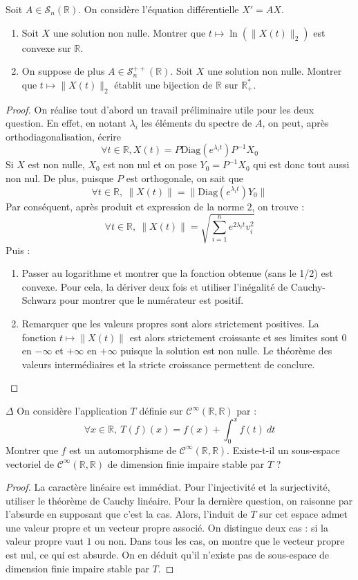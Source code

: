 \documentclass[french,a4paper]{article}
\newcommand{\R}{\mathbb{R}}
\newcommand{\st}{^*}
\newcommand{\inv}{^{-1}}
\theoremstyle{plain}
\theoremstyle{definition}
\theoremstyle{remark}
\begin{document}
\begin{ex}{}
	Soit $A\in\mathcal{S}_n(\R)$. On considère l'équation différentielle $X'=AX$.
	\begin{enumerate}
		\item Soit $X$ une solution non nulle. Montrer que $t\mapsto\ln\left(\lVert X(t)\rVert_2\right)$ est convexe sur $\R$.
		\item On suppose de plus $A\in\mathcal{S}_n^{++}(\R)$. Soit $X$ une solution non nulle. Montrer que $t\mapsto \lVert X(t)\rVert_2$ établit une bijection de $\R$ sur $\R_+\st$.
	\end{enumerate}
\end{ex}
\begin{proof}
	On réalise tout d'abord un travail préliminaire utile pour les deux question. En effet, en notant $\lambda_i$ les éléments du spectre de $A$, on peut, après orthodiagonalisation, écrire $$\forall t\in\R, X(t)=P\text{Diag}(e^{\lambda_i t})P\inv X_0$$ Si $X$ est non nulle, $X_0$ est non nul et on pose $Y_0=P\inv X_0$ qui est donc tout aussi non nul. De plus, puisque $P$ est orthogonale, on sait que $$\forall t\in\R,\ \lVert X(t)\rVert =\lVert \text{Diag}(e^{\lambda_i t})Y_0\rVert$$ Par conséquent, après produit et expression de la norme $2$, on trouve : $$\forall t\in\R,\ \lVert X(t)\rVert=\sqrt{\sum_{i=1}^{n}e^{2\lambda_i t}v_i^2}$$
	Puis :
	\begin{enumerate}
		\item Passer au logarithme et montrer que la fonction obtenue (sans le 1/2) est convexe. Pour cela, la dériver deux fois et utiliser l'inégalité de Cauchy-Schwarz pour montrer que le numérateur est positif.
		\item Remarquer que les valeurs propres sont alors strictement positives. La fonction $t\mapsto\lVert X(t)\rVert$ est alors strictement croissante et ses limites sont $0$ en $-\infty$ et $+\infty$ en $+\infty$ puisque la solution est non nulle. Le théorème des valeurs intermédiaires et la stricte croissance permettent de conclure.
	\end{enumerate}
\end{proof}

\begin{ex}[Moulin.38]{$\Delta$}
	On considère l'application $T$ définie sur $\mathcal{C}^{\infty}(\R,\R)$ par : $$\forall x\in\R,\ T(f)(x)=f(x)+\int_{0}^{x}f(t)\ dt$$ Montrer que $f$ est un automorphisme de $\mathcal{C}^\infty(\R,\R)$. Existe-t-il un sous-espace vectoriel de $\mathcal{C}^\infty(\R,\R)$ de dimension finie impaire stable par $T$ ?
\end{ex}
\begin{proof}
	La caractère linéaire est immédiat. Pour l'injectivité et la surjectivité, utiliser le théorème de Cauchy linéaire. Pour la dernière question, on raisonne par l'absurde en supposant que c'est la cas. Alors, l'induit de $T$ sur cet espace admet une valeur propre et un vecteur propre associé. On distingue deux cas : si la valeur propre vaut $1$ ou non. Dans tous les cas, on montre que le vecteur propre est nul, ce qui est absurde. On en déduit qu'il n'existe pas de sous-espace de dimension finie impaire stable par $T$.
\end{proof}
\end{document}
